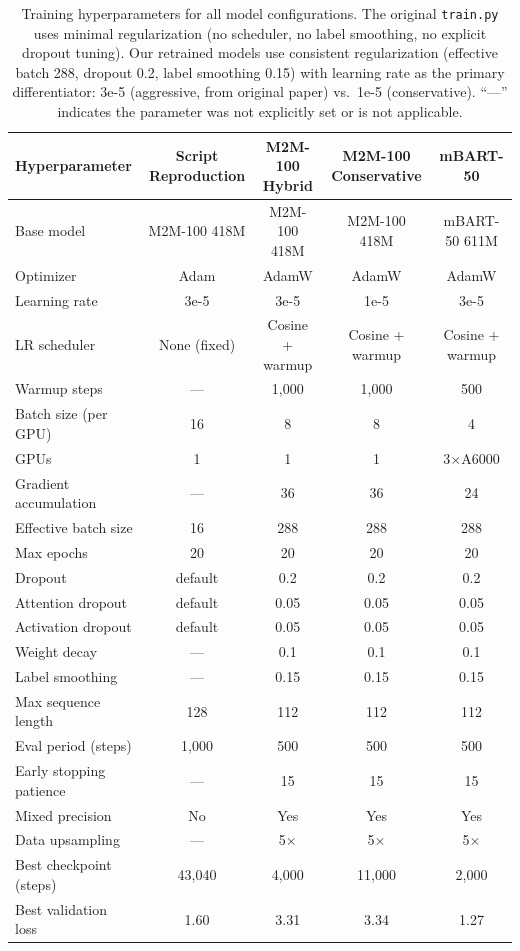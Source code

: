 
\begin{table}[t]
\centering
\small
\begin{tabular}{@{}lcccc@{}}
\toprule
\textbf{Hyperparameter} & \textbf{Script Reproduction} & \textbf{M2M-100 Hybrid} & \textbf{M2M-100 Conservative} & \textbf{mBART-50} \\
\midrule
Base model & M2M-100 418M & M2M-100 418M & M2M-100 418M & mBART-50 611M \\
Optimizer & Adam & AdamW & AdamW & AdamW \\
Learning rate & 3e-5 & 3e-5 & 1e-5 & 3e-5 \\
LR scheduler & None (fixed) & Cosine + warmup & Cosine + warmup & Cosine + warmup \\
Warmup steps & --- & 1,000 & 1,000 & 500 \\
\addlinespace
Batch size (per GPU) & 16 & 8 & 8 & 4 \\
GPUs & 1 & 1 & 1 & 3$\times$A6000 \\
Gradient accumulation & --- & 36 & 36 & 24 \\
Effective batch size & 16 & 288 & 288 & 288 \\
Max epochs & 20 & 20 & 20 & 20 \\
\addlinespace
Dropout & default & 0.2 & 0.2 & 0.2 \\
Attention dropout & default & 0.05 & 0.05 & 0.05 \\
Activation dropout & default & 0.05 & 0.05 & 0.05 \\
Weight decay & --- & 0.1 & 0.1 & 0.1 \\
Label smoothing & --- & 0.15 & 0.15 & 0.15 \\
\addlinespace
Max sequence length & 128 & 112 & 112 & 112 \\
Eval period (steps) & 1,000 & 500 & 500 & 500 \\
Early stopping patience & --- & 15 & 15 & 15 \\
Mixed precision & No & Yes & Yes & Yes \\
Data upsampling & --- & 5$\times$ & 5$\times$ & 5$\times$ \\
\addlinespace
Best checkpoint (steps) & 43,040 & 4,000 & 11,000 & 2,000 \\
Best validation loss & 1.60 & 3.31 & 3.34 & 1.27 \\
\bottomrule
\end{tabular}
\caption{Training hyperparameters for all model configurations. The original \texttt{train.py} uses minimal regularization (no scheduler, no label smoothing, no explicit dropout tuning). Our retrained models use consistent regularization (effective batch 288, dropout 0.2, label smoothing 0.15) with learning rate as the primary differentiator: 3e-5 (aggressive, from original paper) vs.\ 1e-5 (conservative). ``---'' indicates the parameter was not explicitly set or is not applicable.}
\label{tab:hyperparameters}
\end{table}
